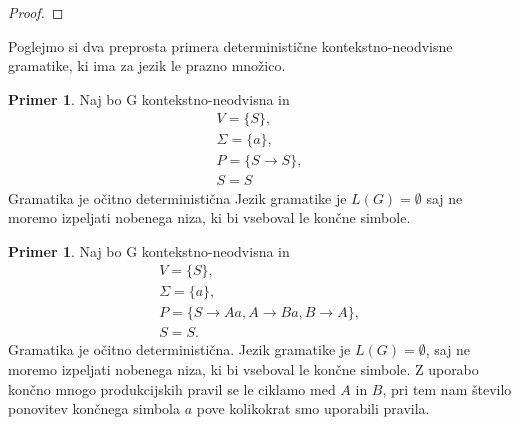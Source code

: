 \documentclass{amsart}
\theoremstyle{definition}
\newtheorem{primer}[definicija]{Primer}
\theoremstyle{plain} %
\begin{document}
\begin{proof}


    
\end{proof}

Poglejmo si dva preprosta primera deterministične kontekstno-neodvisne gramatike, ki ima za jezik le prazno množico.

\begin{primer}
    Naj bo G kontekstno-neodvisna in 
    \begin{gather*}
        V = \{ S \}, \\
        \Sigma = \{ a \}, \\
        P = \{ S \rightarrow S \}, \\
        S = S
    \end{gather*}
    Gramatika je očitno deterministična Jezik gramatike je $ L(G) = \emptyset $ saj ne moremo izpeljati
    nobenega niza, ki bi vseboval le končne simbole.
\end{primer}

\begin{primer}\label{deterministična}
    Naj bo G kontekstno-neodvisna in 
    \begin{gather*}
        V = \{ S \}, \\
        \Sigma = \{ a \}, \\
        P = \{ S \rightarrow Aa, A \rightarrow Ba, B \rightarrow A \}, \\
        S = S.
    \end{gather*}
    Gramatika je očitno deterministična. Jezik gramatike je $ L(G) = \emptyset $, saj ne moremo izpeljati
    nobenega niza, ki bi vseboval le končne simbole. Z uporabo končno mnogo produkcijskih pravil se le 
    ciklamo med $A$ in $B$, pri tem nam število ponovitev končnega simbola $a$ pove kolikokrat smo uporabili
    pravila.
\end{primer}
\end{document}
